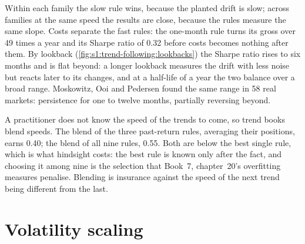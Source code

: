 Within each family the slow rule wins, because the planted drift is slow; across families at the same speed the results are close, because the rules
measure the same slope. Costs separate the fast rules: the one-month rule turns its gross over 49 times a year and its Sharpe ratio of 0.32 before costs
becomes nothing after them. By lookback (\cref{fig:s1:trend-following:lookbacks}) the Sharpe ratio rises to six months and is flat beyond: a longer
lookback measures the drift with less noise but reacts later to its changes, and at a half-life of a year the two balance over a broad range. Moskowitz,
Ooi and Pedersen found the same range in 58 real markets: persistence for one to twelve months, partially reversing beyond.

\begin{omfigure}

\label{fig:s1:trend-following:lookbacks}
\end{omfigure}

A practitioner does not know the speed of the trends to come, so trend books blend speeds. The blend of the three past-return rules, averaging their
positions, earns 0.40; the blend of all nine rules, 0.55. Both are below the best single rule, which is what hindsight costs: the best rule is known only
after the fact, and choosing it among nine is the selection that Book~7, chapter~20's overfitting measures penalise. Blending is insurance against the
speed of the next trend being different from the last.

\section{Volatility scaling}

